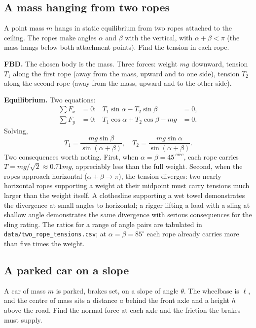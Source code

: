 \subsection{A mass hanging from two ropes}



A point mass $m$ hangs in static equilibrium from two ropes attached
to the ceiling. The ropes make angles $\alpha$ and $\beta$ with the
vertical, with $\alpha + \beta < \pi$ (the mass hangs below both
attachment points). Find the tension in each rope.

\textbf{FBD.} The chosen body is the mass. Three forces: weight $mg$
downward, tension $T_1$ along the first rope (away from the mass,
upward and to one side), tension $T_2$ along the second rope (away
from the mass, upward and to the other side).

\textbf{Equilibrium.} Two equations:
\begin{align*}
\sum F_x &= 0: & T_1 \sin\alpha - T_2 \sin\beta &= 0, \\
\sum F_y &= 0: & T_1 \cos\alpha + T_2 \cos\beta - mg &= 0.
\end{align*}
Solving,
\[
T_1 = \frac{mg \sin\beta}{\sin(\alpha+\beta)}, \quad
T_2 = \frac{mg \sin\alpha}{\sin(\alpha+\beta)}.
\]
Two consequences worth noting. First, when $\alpha = \beta = 45^{\
circ}$, each rope carries $T = mg / \sqrt{2} \approx 0.71 mg$,
appreciably less than the full weight. Second, when the ropes
approach horizontal ($\alpha + \beta \to \pi$), the tension diverges:
two nearly horizontal ropes supporting a weight at their midpoint
must carry tensions much larger than the weight itself. A
clothesline supporting a wet towel demonstrates the divergence at
small angles to horizontal; a rigger lifting a load with a sling at
shallow angle demonstrates the same divergence with serious
consequences for the sling rating. The ratios for a range of angle
pairs are tabulated in \texttt{data/two\_rope\_tensions.csv}; at
$\alpha = \beta = 85^{\circ}$ each rope already carries more than five
times the weight.

\subsection{A parked car on a slope}



A car of mass $m$ is parked, brakes set, on a slope of angle $\theta$.
The wheelbase is $\ell$, and the centre of mass sits a distance $a$
behind the front axle and a height $h$ above the road. Find the normal
force at each axle and the friction the brakes must supply.

